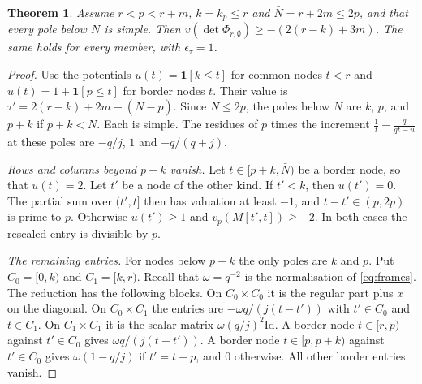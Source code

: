 \documentclass[11pt]{amsart}
\newtheorem{theorem}{Theorem}[section]
\theoremstyle{definition}
\theoremstyle{remark}
\numberwithin{equation}{section}
\newcommand{\Id}{\mathrm{Id}}
\begin{document}
\begin{theorem}\label{thm:lp2}
Assume $r<p<r+m$, $k=k_p\le r$ and $\bar N=r+2m\le2p$, and that every pole below $\bar N$ is simple. Then
$v(\det\Phi_{r,\emptyset})\ge-(2(r-k)+3m)$. The same holds for every member, with $\epsilon_\tau=1$.
\end{theorem}
\begin{proof}
Use the potentials $u(t)=\mathbf 1[k\le t]$ for common nodes $t<r$ and $u(t)=1+\mathbf 1[p\le t]$ for border nodes $t$.
Their value is $\tau'=2(r-k)+2m+(\bar N-p)$. Since $\bar N\le2p$, the poles below $\bar N$ are $k$, $p$, and $p+k$ if $p+k<\bar N$. Each is
simple. The residues of $p$ times the increment $\frac1t-\frac q{qt-u}$ at these poles are $-q/j$, $1$ and $-q/(q+j)$.

\emph{Rows and columns beyond $p+k$ vanish.} Let $t\in[p+k,\bar N)$ be a border node, so that $u(t)=2$. Let $t'$ be a node of
the other kind. If $t'<k$, then $u(t')=0$. The partial sum over $(t',t]$ then has valuation at least $-1$, and
$t-t'\in(p,2p)$ is prime to $p$. Otherwise $u(t')\ge1$ and $v_p(M[t',t])\ge-2$. In both cases the rescaled entry is
divisible by $p$.

\emph{The remaining entries.} For nodes below $p+k$ the only poles are $k$ and $p$. Put $C_0=[0,k)$ and $C_1=[k,r)$.
Recall that $\omega=q^{-2}$ is the normalisation of \eqref{eq:frames}. The reduction has the following blocks. On
$C_0\times C_0$ it is the regular part plus $x$ on the diagonal. On $C_0\times C_1$ the entries are
$-\omega q/(j(t-t'))$ with $t'\in C_0$ and $t\in C_1$. On $C_1\times C_1$ it is the scalar matrix $\omega(q/j)^2\Id$. A
border node $t\in[r,p)$ against $t'\in C_0$ gives $\omega q/(j(t-t'))$. A border node $t\in[p,p+k)$ against $t'\in C_0$
gives $\omega(1-q/j)$ if $t'=t-p$, and $0$ otherwise. All other border entries vanish.


\end{proof}
\end{document}
